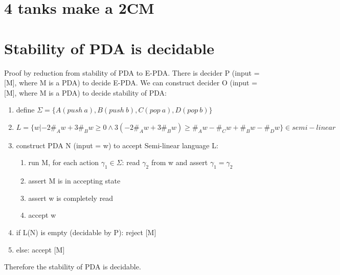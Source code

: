 \documentclass{article}
\begin{document}
\section{4 tanks make a 2CM}

\section{Stability of PDA is decidable}
Proof by reduction from stability of PDA to E-PDA.
There is decider P (input = [M], where M is a PDA) to decide E-PDA.
We can construct decider O (input = [M], where M is a PDA) to decide stability 
of PDA:
\begin{enumerate}
	\item define $ \Sigma = \{A(push \ a), B(push \ b), C(pop \ a), D(pop \ 
	b)\} $
	\item $ L = \{w |  -2\#_Aw + 3\#_Bw \ge 0
	\land  3(-2\#_Aw + 3\#_Bw) \ge \#_Aw-\#_Cw + \#_Bw-\#_Dw\} \in semi-linear$
	\item construct PDA N (input = w) to accept Semi-linear language L:
	\begin{enumerate}
		\item run M, for each action $ \gamma_1 \in \Sigma $: read $ \gamma_2 $ 
		from w and assert $ \gamma_1 = \gamma_2 $
		\item assert M is in accepting state
		\item assert w is completely read
		\item accept w
	\end{enumerate}
	\item if L(N) is empty (decidable by P): reject [M]
	\item else: accept [M]
\end{enumerate}
Therefore the stability of PDA is decidable.
\end{document}
